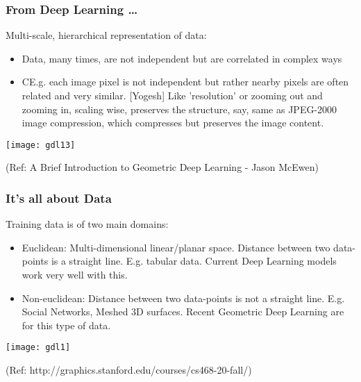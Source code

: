 \begin{frame}[fragile]\frametitle{From Deep Learning \ldots}

Multi-scale, hierarchical representation of data:

\begin{itemize}
\item Data, many times, are not independent but are correlated in complex ways
\item CE.g. each image pixel is not independent but rather nearby pixels are often related and very similar. [Yogesh] Like 'resolution' or zooming out and zooming in, scaling wise, preserves the structure, say, same as  JPEG-2000 image compression, which compresses but preserves the image content.
\end{itemize}

\begin{center}
\texttt{[image: gdl13]}
\end{center}

{\tiny (Ref: A Brief Introduction to Geometric Deep Learning - Jason McEwen)}

\end{frame}



\begin{frame}[fragile]\frametitle{It's all about Data}

Training data is of two main domains:
\begin{itemize}
\item Euclidean: Multi-dimensional linear/planar space. Distance between two data-points is a straight line. E.g. tabular data. Current Deep Learning models work very well with this.
\item Non-euclidean: Distance between two data-points is not a straight line. E.g. Social Networks, Meshed 3D surfaces. Recent Geometric Deep Learning are for this type of data.
\end{itemize}
	  
\begin{center}
\texttt{[image: gdl1]}
\end{center}

{\tiny (Ref: http://graphics.stanford.edu/courses/cs468-20-fall/)}

\end{frame}


